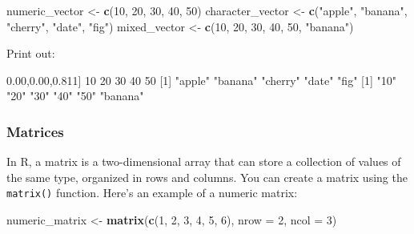 \documentclass[
]{book}
\newenvironment{Shaded}{\begin{snugshade}}{\end{snugshade}}
\newcommand{\AttributeTok}[1]{\textcolor[rgb]{0.13,0.29,0.53}{#1}}
\newcommand{\DecValTok}[1]{\textcolor[rgb]{0.00,0.00,0.81}{#1}}
\newcommand{\FunctionTok}[1]{\textcolor[rgb]{0.13,0.29,0.53}{\textbf{#1}}}
\newcommand{\NormalTok}[1]{#1}
\newcommand{\OtherTok}[1]{\textcolor[rgb]{0.56,0.35,0.01}{#1}}
\newcommand{\StringTok}[1]{\textcolor[rgb]{0.31,0.60,0.02}{#1}}
\begin{document}
\begin{Shaded}
\begin{Highlighting}[]
\NormalTok{numeric\_vector }\OtherTok{\textless{}{-}} \FunctionTok{c}\NormalTok{(}\DecValTok{10}\NormalTok{, }\DecValTok{20}\NormalTok{, }\DecValTok{30}\NormalTok{, }\DecValTok{40}\NormalTok{, }\DecValTok{50}\NormalTok{)}
\NormalTok{character\_vector }\OtherTok{\textless{}{-}} \FunctionTok{c}\NormalTok{(}\StringTok{"apple"}\NormalTok{, }\StringTok{"banana"}\NormalTok{, }\StringTok{"cherry"}\NormalTok{, }\StringTok{"date"}\NormalTok{, }\StringTok{"fig"}\NormalTok{)}
\NormalTok{mixed\_vector }\OtherTok{\textless{}{-}} \FunctionTok{c}\NormalTok{(}\DecValTok{10}\NormalTok{, }\DecValTok{20}\NormalTok{, }\DecValTok{30}\NormalTok{, }\DecValTok{40}\NormalTok{, }\DecValTok{50}\NormalTok{, }\StringTok{"banana"}\NormalTok{)}
\end{Highlighting}
\end{Shaded}

Print out:

\begin{Shaded}
\begin{Highlighting}[]
\NormalTok{[}\DecValTok{1}\NormalTok{] }\DecValTok{10} \DecValTok{20} \DecValTok{30} \DecValTok{40} \DecValTok{50}
\NormalTok{[}\DecValTok{1}\NormalTok{] }\StringTok{"apple"}  \StringTok{"banana"} \StringTok{"cherry"} \StringTok{"date"}   \StringTok{"fig"} 
\NormalTok{[}\DecValTok{1}\NormalTok{] }\StringTok{"10"}     \StringTok{"20"}     \StringTok{"30"}     \StringTok{"40"}     \StringTok{"50"}     \StringTok{"banana"}
\end{Highlighting}
\end{Shaded}

\hypertarget{matrices}{%
\subsubsection{Matrices}\label{matrices}}

In R, a matrix is a two-dimensional array that can store a collection of values of the same type, organized in rows and columns. You can create a matrix using the \texttt{matrix()} function. Here's an example of a numeric matrix:

\begin{Shaded}
\begin{Highlighting}[]
\NormalTok{numeric\_matrix }\OtherTok{\textless{}{-}} \FunctionTok{matrix}\NormalTok{(}\FunctionTok{c}\NormalTok{(}\DecValTok{1}\NormalTok{, }\DecValTok{2}\NormalTok{, }\DecValTok{3}\NormalTok{, }\DecValTok{4}\NormalTok{, }\DecValTok{5}\NormalTok{, }\DecValTok{6}\NormalTok{), }\AttributeTok{nrow =} \DecValTok{2}\NormalTok{, }\AttributeTok{ncol =} \DecValTok{3}\NormalTok{)}
\end{Highlighting}
\end{Shaded}
\end{document}
